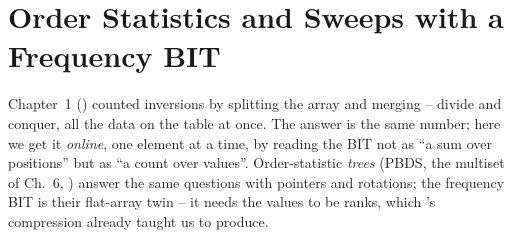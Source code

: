\section{Order Statistics and Sweeps with a Frequency BIT}\label{sec:c14-order}

\begin{previouslybox}
Chapter~1 () counted inversions by splitting the array and
merging -- divide and conquer, all the data on the table at once.  The
answer is the same number; here we get it \emph{online}, one element at a
time, by reading the BIT not as ``a sum over positions'' but as ``a count
over values''.  Order-statistic \emph{trees} (PBDS, the multiset of Ch.~6,
) answer the same questions with pointers and rotations; the
frequency BIT is their flat-array twin -- it needs the values to be ranks,
which 's compression already taught us to produce.
\end{previouslybox}

